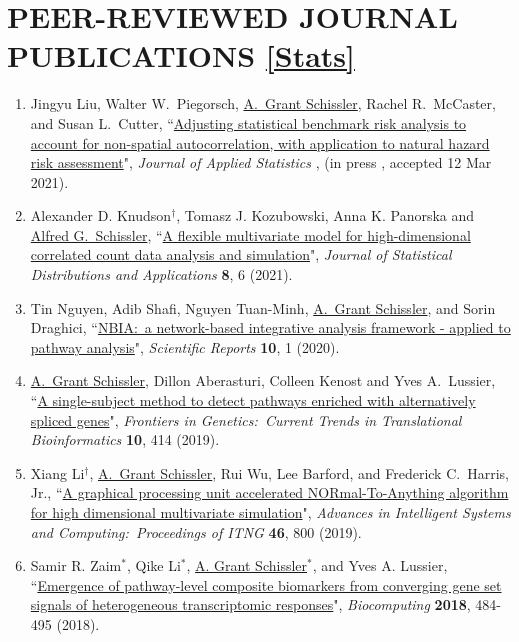 \documentclass[paper=a4,fontsize=11pt]{scrartcl} %
\newcommand{\NewPart}[2]{\section*{\uppercase{#1} #2 }}
\newcommand{\PaperEntry}[7]{
		\noindent #1, ``\href{#7}{#2}", \textit{#3} \textbf{#4}, #5 (#6).}
\begin{document}
\NewPart{Peer-Reviewed Journal Publications}{\href{https://scholar.google.com/citations?user=1H-SHoMAAAAJ&hl=en}{[Stats]}}
\vspace{-7pt}
\begin{enumerate}

\item \PaperEntry{Jingyu Liu, Walter W.~Piegorsch, \underline{A.~Grant Schissler}, Rachel R.~McCaster, and Susan L.~Cutter}{Adjusting statistical benchmark risk analysis to account for non-spatial autocorrelation, with application to natural hazard risk assessment}{Journal of Applied Statistics}{}{}{in press , accepted 12 Mar 2021}{}

  \item \PaperEntry{Alexander D. Knudson$^{\dagger}$, Tomasz J. Kozubowski, Anna K. Panorska and \underline{Alfred G.~Schissler}}{A flexible multivariate model for high-dimensional correlated count data analysis and simulation}{Journal of Statistical Distributions and Applications}{8}{6}{2021}{https://rdcu.be/cgTkg}

  \item \PaperEntry{Tin Nguyen, Adib Shafi, Nguyen Tuan-Minh, \underline{A.~Grant Schissler}, and Sorin Draghici}{NBIA:~a network-based integrative analysis framework - applied to pathway analysis}{Scientific Reports}{10}{1}{2020}{https://www.nature.com/articles/s41598-020-60981-9}
  
\item \PaperEntry{\underline{A.~Grant Schissler}, Dillon Aberasturi, Colleen Kenost and Yves A.~Lussier}{A single-subject method to detect pathways enriched with alternatively spliced genes}{Frontiers in Genetics:~Current Trends in Translational Bioinformatics}{10}{414}{2019}{https://www.frontiersin.org/articles/10.3389/fgene.2019.00414/full}
  
    \item \PaperEntry{Xiang Li$^{\dagger}$, \underline{A.~Grant Schissler}, Rui Wu, Lee Barford, and Frederick C.~Harris, Jr.}{A graphical processing unit accelerated NORmal-To-Anything algorithm for high dimensional multivariate simulation}{Advances in Intelligent Systems and Computing:~Proceedings of ITNG}{46}{800}{2019}{https://link.springer.com/chapter/10.1007/978-3-030-14070-0_46}
  
\item \PaperEntry{Samir R. Zaim$^{*}$, Qike Li$^{*}$, \underline{A. Grant Schissler}$^{*}$, and Yves A. Lussier}{Emergence of pathway-level composite biomarkers from converging gene set signals of heterogeneous transcriptomic responses}{Biocomputing}{2018}{484-495}{2018}{https://www.worldscientific.com/doi/abs/10.1142/9789813235533_0044}
  

\end{enumerate}
\end{document}
